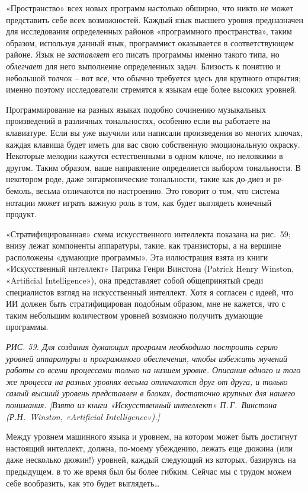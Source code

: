 \documentclass[../main.tex]{subfiles}
\begin{document}
«Пространство» всех новых программ настолько обширно, что никто не может представить себе всех возможностей. Каждый язык высшего уровня предназначен для исследования определенных районов «программного пространства», таким образом, используя данный язык, программист оказывается в соответствующем районе. Язык не \emph{заставляет} его писать программы именно такого типа, но \emph{облегчает} для него выполнение определенных задач. Близость к понятию и небольшой толчок \--- вот все, что обычно требуется здесь для крупного открытия; именно поэтому исследователи стремятся к языкам еще более высоких уровней.

Программирование на разных языках подобно сочинению музыкальных произведений в различных тональностях, особенно если вы работаете на клавиатуре. Если вы уже выучили или написали произведения во многих ключах, каждая клавиша будет иметь для вас свою собственную эмоциональную окраску. Некоторые мелодии кажутся естественными в одном ключе, но неловкими в другом. Таким образом, ваше направление определяется выбором тональности. В некотором роде, даже энгармонические тональности, такие как до-диез и ре-бемоль, весьма отличаются по настроению. Это говорит о том, что система нотации может играть важную роль в том, как будет выглядеть конечный продукт.

«Стратифицированная» схема искусственного интеллекта показана на рис.~59; внизу лежат компоненты аппаратуры, такие, как транзисторы, а на вершине расположены «думающие программы». Эта иллюстрация взята из книги «Искусственный интеллект» Патрика Генри Винстона (Patrick Henry Winston, «Artificial Intelligence»), она представляет собой общепринятый среди специалистов взгляд на искусственный интеллект. Хотя я согласен с идеей, что ИИ должен быть стратифицирован подобным образом, мне не кажется, что с таким небольшим количеством уровней возможно получить думающие программы.

\emph{РИС. 59. Для создания думающих программ необходимо построить серию уровней аппаратуры и программного обеспечения, чтобы избежать мучений работы со всеми процессами только на низшем уровне. Описания одного и того же процесса на разных уровнях весьма отличаются друг от друга, и только самый высший уровень представлен в блоках, достаточно крупных для нашего понимания. {[}Взято из книги «Искусственный интеллект» П.\,Г.~Винстона (Р.Н.~Winston, «Artificial Intelligence»).{]}}

Между уровнем машинного языка и уровнем, на котором может быть достигнут настоящий интеллект, должна, по-моему убеждению, лежать еще дюжина (или даже несколько дюжин!) уровней, каждый следующий из которых, базируясь на предыдущем, в то же время был бы более гибким. Сейчас мы с трудом можем себе вообразить, как это будет выглядеть\ldots{}
\end{document}
